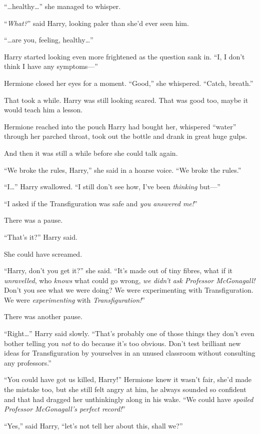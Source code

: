 “…healthy…” she managed to whisper.

“\emph{What?}” said Harry, looking paler than she’d ever seen him.

“…are you, feeling, healthy…”

Harry started looking even more frightened as the question sank in. “I, I don’t think I have any symptoms—”

Hermione closed her eyes for a moment. “Good,” she whispered. “Catch, breath.”

That took a while. Harry was still looking scared. That was good too, maybe it would teach him a lesson.

Hermione reached into the pouch Harry had bought her, whispered “water” through her parched throat, took out the bottle and drank in great huge gulps.

And then it was still a while before she could talk again.

“We broke the rules, Harry,” she said in a hoarse voice. “We broke the rules.”

“I…” Harry swallowed. “I still don’t see how, I’ve been \emph{thinking} but—”

“I asked if the Transfiguration was safe and \emph{you answered me!}”

There was a pause.

“That’s it?” Harry said.

She could have screamed.

“Harry, don’t you get it?” she said. “It’s made out of tiny fibres, what if it \emph{unravelled}, who \emph{knows} what could go wrong, \emph{we didn’t ask Professor McGonagall!} Don’t you see what we were doing? We were experimenting with Transfiguration. We were \emph{experimenting} with \emph{Transfiguration!}”

There was another pause.

“Right…” Harry said slowly. “That’s probably one of those things they don’t even bother telling you \emph{not} to do because it’s too obvious. Don’t test brilliant new ideas for Transfiguration by yourselves in an unused classroom without consulting any professors.”

“You could have got us killed, Harry!” Hermione knew it wasn’t fair, she’d made the mistake too, but she still felt angry at him, he always sounded so confident and that had dragged her unthinkingly along in his wake. “We could have \emph{spoiled Professor McGonagall’s perfect record!}”

“Yes,” said Harry, “let’s not tell her about this, shall we?”

